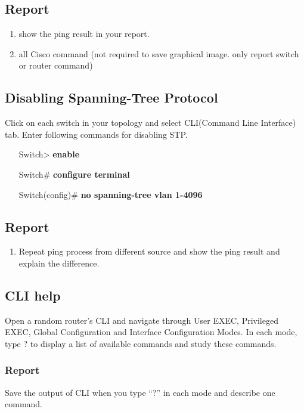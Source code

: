 \documentclass[10pt,a4paper]{article}
\numberwithin{equation}{section}
\numberwithin{figure}{section}
\numberwithin{table}{section}
\begin{document}
\subsection*{Report}
	\begin{enumerate}
		\item show the ping result in your report.
		\item all Cisco command (not required to save graphical image. only report switch or router command)
	\end{enumerate}
    

\subsection{Disabling Spanning-Tree Protocol}
	Click on each switch in your topology and select CLI(Command Line Interface) tab. Enter following commands for disabling STP.
    \begin{itemize}
        \setlength{\itemindent}{50pt}
		\item [Switch>] \textbf{enable}
		\item [Switch\#] \textbf{configure terminal}
		\item [Switch(config)\#] \textbf{no spanning-tree vlan 1-4096}
	\end{itemize}

    \subsection*{Report}
    \begin{enumerate}
        \item Repeat ping process from different source and show the ping result and explain the difference.

    \end{enumerate}
    
\subsection{CLI help}
    Open a random router’s CLI and navigate through User EXEC, Privileged EXEC, Global Configuration and Interface Configuration Modes. In each mode, type ? to display a list of available commands and study these commands.

\subsubsection*{Report}
 Save the output of CLI when you type “?” in each mode and describe one command.
    
\end{document}
